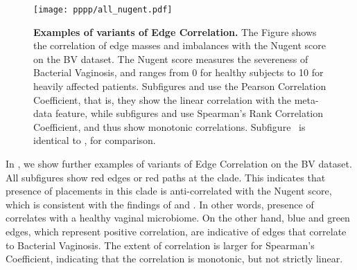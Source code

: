 %
%


\begin{figure}[!hpbt]
    \centering
    \texttt{[image: pppp/all\_nugent.pdf]}
    \begin{subfigure}{0pt}
        \label{fig:all_nugent:sub:pcc_em}
    \end{subfigure}
    \begin{subfigure}{0pt}
        \label{fig:all_nugent:sub:pcc_ei}
    \end{subfigure}
    \begin{subfigure}{0pt}
        \label{fig:all_nugent:sub:srcc_em}
    \end{subfigure}
    \begin{subfigure}{0pt}
        \label{fig:all_nugent:sub:srcc_ei}
    \end{subfigure}
    \caption[Examples of variants of Edge Correlation]{
        \textbf{Examples of variants of Edge Correlation.}
        The Figure shows the correlation of edge masses and imbalances with the Nugent score on the \ac{BV} dataset.
        The Nugent score measures the severeness of Bacterial Vaginosis,
        and ranges from \num{0} for healthy subjects to \num{10} for heavily affected patients.
        Subfigures  and  use the
        Pearson Correlation Coefficient, that is, they show the linear correlation with the meta-data feature,
        while subfigures  and  use
        Spearman's Rank Correlation Coefficient, and thus show monotonic correlations.
        Subfigure~ is identical to , for comparison.
    }
    \label{fig:all_nugent}
\end{figure}

In , we show further examples of variants of Edge Correlation on the \ac{BV} dataset.
All subfigures show red edges or red paths at the  clade.
This indicates that presence of placements in this clade is anti-correlated with the Nugent score,
which is consistent with the findings of \cite{Srinivasan2012} and \cite{Matsen2011a}.
In other words, presence of  correlates with a healthy vaginal microbiome.
On the other hand, blue and green edges, which represent positive correlation,
are indicative of edges that correlate to Bacterial Vaginosis.
The extent of correlation is larger for Spearman's Coefficient,
indicating that the correlation is monotonic, but not strictly linear.

